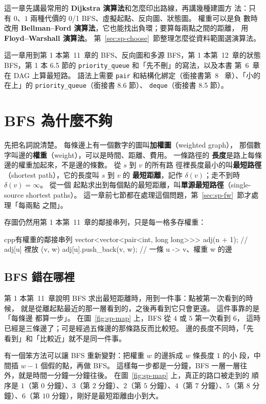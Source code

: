 這一章先講最常用的 \textbf{Dijkstra 演算法}和怎麼印出路線，再講幾種建圖方
法：只有 $0$、$1$ 兩種代價的 0/1 BFS、虛擬起點、反向圖、狀態圖。 權重可以是負
數時改用 \textbf{Bellman--Ford 演算法}，它也能找出負環；要算每兩點之間的距離，
用 \textbf{Floyd--Warshall 演算法}。 第~\ref{sec:sp-choose}~節整理怎麼從資料範圍選演算法。

這一章用到第 1 本第~11~章的 BFS、反向圖和多源 BFS，第 1 本第~12~章的狀態
BFS，第 1 本 6.5 節的 \texttt{priority\_queue} 和「先不刪」的寫法，以及本書
第~6~章在 DAG 上算最短路。 語法上需要 \texttt{pair} 和結構化綁定（銜接書第~8~
章）、「小的在上」的 \texttt{priority\_queue}（銜接書 8.6 節）、
\texttt{deque}（銜接書 8.5 節）。

\section{BFS 為什麼不夠}
\label{sec:sp-why}

先把名詞說清楚。 每條邊上有一個數字的圖叫\textbf{加權圖}（weighted graph），
那個數字叫邊的\textbf{權重}（weight），可以是時間、距離、費用。 一條路徑的
\textbf{長度}是路上每條邊的權重加起來，不是邊的條數。 從 $s$ 到 $v$ 的所有路
徑裡長度最小的叫\textbf{最短路徑}（shortest path），它的長度叫 $s$ 到 $v$ 的
\textbf{最短距離}，記作 $\delta(v)$；走不到時 $\delta(v) = \infty$。 從一個
起點求出到每個點的最短距離，叫\textbf{單源最短路徑}（single-source shortest
paths）。 這一章前七節都在處理這個問題，第~\ref{sec:sp-fw}~節才處理「每兩點
之間」。

存圖仍然用第 1 本第~11~章的鄰接串列，只是每一格多存權重：

\begin{code}{cpp}{有權重的鄰接串列}
vector<vector<pair<int, long long>>> adj(n + 1);   // adj[u] 裡放 (v, w)
adj[u].push_back({v, w});                          // 一條 u -> v、權重 w 的邊
\end{code}

\subsection{BFS 錯在哪裡}

第 1 本第~11~章說明 BFS 求出最短距離時，用到一件事：點被第一次看到的時候，
就是從離起點最近的那一層看到的，之後再看到它只會更遠。 這件事靠的是「每條邊
都算一步」。 在圖~\ref{fig:sp-map} 上，BFS 從 $4$ 或 $5$ 第一次看到 $6$，
這時已經是三條邊了；可是經過五條邊的那條路反而比較短。 邊的長度不同時，「先
看到」和「比較近」就不是同一件事。

有一個笨方法可以讓 BFS 重新變對：把權重 $w$ 的邊拆成 $w$ 條長度 $1$ 的小
段，中間插 $w - 1$ 個假的點，再做 BFS。 這樣每一步都是一分鐘，BFS 一層一層往
外，就是時間一分鐘一分鐘往後。 在圖~\ref{fig:sp-map} 上，真正的路口被走到的
順序是 $1$（第 $0$ 分鐘）、$3$（第 $2$ 分鐘）、$2$（第 $5$ 分鐘）、$4$（第
$7$ 分鐘）、$5$（第 $8$ 分鐘）、$6$（第 $10$ 分鐘），剛好是最短距離由小到大。

